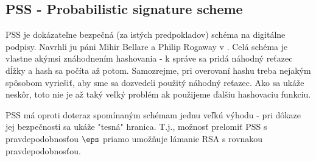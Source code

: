 \subsection{PSS - Probabilistic signature scheme}

PSS je dokázateľne bezpečná (za istých predpokladov) schéma na
digitálne podpisy. Navrhli ju páni Mihir Bellare a Philip Rogaway
v \cite{pss}. Celá schéma je vlastne akýmsi znáhodnením hashovania - k
správe sa pridá náhodný reťazec dĺžky \todo{} a hash sa počíta až
potom. Samozrejme, pri overovaní hashu treba nejakým spôsobom
vyriešiť, aby sme sa dozvedeli použitý náhodný reťazec. Ako sa ukáže
neskôr, toto nie je až taký veľký problém ak použijeme ďalšiu
hashovaciu funkciu.

PSS má oproti doteraz spomínaným schémam jednu veľkú výhodu - pri
dôkaze jej bezpečnosti sa ukáže "tesná" hranica. T.j., možnosť
prelomiť PSS s pravdepodobnosťou $\eps$ priamo umožňuje lámanie RSA s
rovnakou pravdepodobnosťou.

